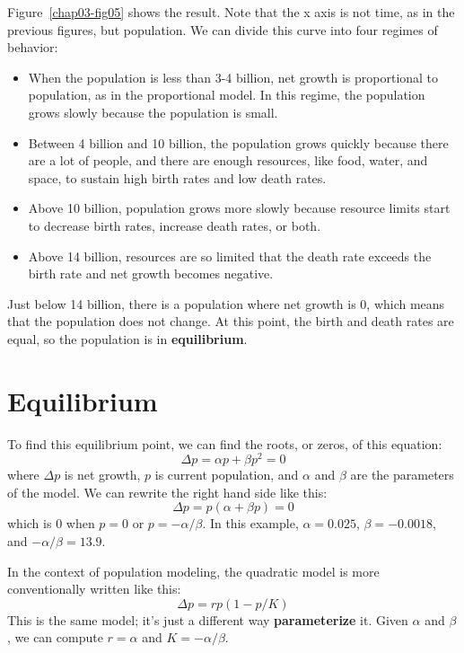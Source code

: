 \documentclass[12pt]{book}
\theoremstyle{exercise}
\begin{document}
Figure~\ref{chap03-fig05} shows the result.  Note that the x axis is not time, as in the previous figures, but population.  We can divide this curve into four regimes of behavior:

\begin{itemize}

\item When the population is less than 3-4 billion, net growth is proportional to population, as in the proportional model.  In this regime,  the population grows slowly because the population is small.

\item Between 4 billion and 10 billion, the population grows quickly because there are a lot of people, and there are enough resources, like food, water, and space, to sustain high birth rates and low death rates.

\item Above 10 billion, population grows more slowly because resource limits start to decrease birth rates, increase death rates, or both.

\item Above 14 billion, resources are so limited that the death rate exceeds the birth rate and net growth becomes negative.

\end{itemize}

Just below 14 billion, there is a population where net growth is 0, which means that the population does not change.  At this point, the birth and death rates are equal, so the population is in {\bf equilibrium}.

\section{Equilibrium}
\label{equilibrium}

To find this equilibrium point, we can find the roots, or zeros, of this equation:
%
\[ \Delta p = \alpha p + \beta p^2 = 0 \]
%
where $\Delta p$ is net growth, $p$ is current population, and $\alpha$ and $\beta$ are the parameters of the model.  We can rewrite the right hand side like this:
%
\[ \Delta p = p (\alpha + \beta p) = 0 \]
%
which is $0$ when $p=0$ or $p=-\alpha/\beta$.  In this example, $\alpha = 0.025$, $\beta = -0.0018$, and $-\alpha/\beta = 13.9$.

In the context of population modeling, the quadratic model is more conventionally written like this:
%
\[ \Delta p = r p (1 - p / K) \]
%
This is the same model; it's just a different way {\bf parameterize} it.  Given $\alpha$ and $\beta$, we can compute $r=\alpha$ and $K=-\alpha/\beta$.
\end{document}
